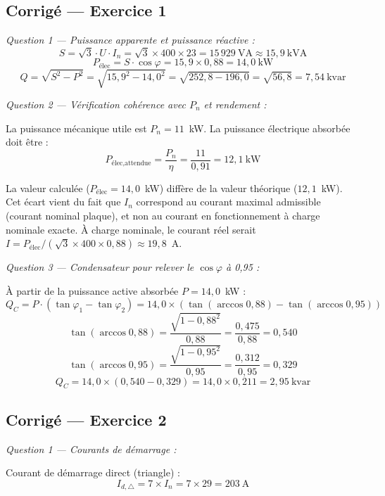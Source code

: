 \subsection*{Corrigé — Exercice 1}

\textit{Question 1 — Puissance apparente et puissance réactive :}
\[
  S = \sqrt{3} \cdot U \cdot I_n = \sqrt{3} \times 400 \times 23 = \boxed{15\,929~\text{VA} \approx 15{,}9~\text{kVA}}
\]
\[
  P_{\text{élec}} = S \cdot \cos\varphi = 15{,}9 \times 0{,}88 = \boxed{14{,}0~\text{kW}}
\]
\[
  Q = \sqrt{S^2 - P^2} = \sqrt{15{,}9^2 - 14{,}0^2} = \sqrt{252{,}8 - 196{,}0} = \sqrt{56{,}8} = \boxed{7{,}54~\text{kvar}}
\]

\textit{Question 2 — Vérification cohérence avec $P_n$ et rendement :}

La puissance mécanique utile est $P_n = 11$~kW. La puissance électrique absorbée doit être :
\[
  P_{\text{élec,attendue}} = \frac{P_n}{\eta} = \frac{11}{0{,}91} = 12{,}1~\text{kW}
\]

\begin{attention}
La valeur calculée ($P_{\text{élec}} = 14{,}0$~kW) diffère de la valeur théorique ($12{,}1$~kW). Cet écart vient du fait que $I_n$ correspond au courant maximal admissible (courant nominal plaque), et non au courant en fonctionnement à charge nominale exacte. À charge nominale, le courant réel serait $I = P_{\text{élec}}/(\sqrt{3} \times 400 \times 0{,}88) \approx 19{,}8$~A.
\end{attention}

\textit{Question 3 — Condensateur pour relever le $\cos\varphi$ à 0,95 :}

À partir de la puissance active absorbée $P = 14{,}0$~kW :
\[
  Q_C = P \cdot (\tan\varphi_1 - \tan\varphi_2) = 14{,}0 \times \left(\tan(\arccos 0{,}88) - \tan(\arccos 0{,}95)\right)
\]
\[
  \tan(\arccos 0{,}88) = \frac{\sqrt{1-0{,}88^2}}{0{,}88} = \frac{0{,}475}{0{,}88} = 0{,}540
\]
\[
  \tan(\arccos 0{,}95) = \frac{\sqrt{1-0{,}95^2}}{0{,}95} = \frac{0{,}312}{0{,}95} = 0{,}329
\]
\[
  Q_C = 14{,}0 \times (0{,}540 - 0{,}329) = 14{,}0 \times 0{,}211 = \boxed{2{,}95~\text{kvar}}
\]

\subsection*{Corrigé — Exercice 2}

\textit{Question 1 — Courants de démarrage :}

Courant de démarrage direct (triangle) :
\[
  I_{d,\triangle} = 7 \times I_n = 7 \times 29 = \boxed{203~\text{A}}
\]


